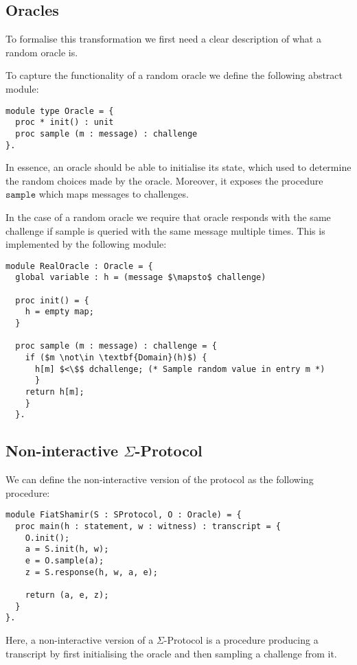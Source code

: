 \subsection{Oracles}
\label{subsec:sigma:fiat:oracle}
To formalise this transformation we first need a clear description of what a
random oracle is.

To capture the functionality of a random oracle we define the following abstract
module:
\begin{lstlisting}
module type Oracle = {
  proc * init() : unit
  proc sample (m : message) : challenge
}.
\end{lstlisting}

In essence, an oracle should be able to initialise its state, which used to
determine the random choices made by the oracle. Moreover, it exposes the
procedure $\texttt{sample}$ which maps messages to challenges.

In the case of a random oracle we require that oracle responds with the same
challenge if sample is queried with the same message multiple times. This is
implemented by the following module:

\begin{lstlisting}[mathescape]
module RealOracle : Oracle = {
  global variable : h = (message $\mapsto$ challenge)

  proc init() = {
    h = empty map;
  }

  proc sample (m : message) : challenge = {
    if ($m \not\in \textbf{Domain}(h)$) {
      h[m] $<\$$ dchallenge; (* Sample random value in entry m *)
      }
    return h[m];
    }
  }.
\end{lstlisting}

\subsection{Non-interactive $\Sigma$-Protocol}
\label{subsec:sigma:fiat:protocol}
We can define the non-interactive version of the protocol as the following procedure:
\begin{lstlisting}
module FiatShamir(S : SProtocol, O : Oracle) = {
  proc main(h : statement, w : witness) : transcript = {
    O.init();
    a = S.init(h, w);
    e = O.sample(a);
    z = S.response(h, w, a, e);

    return (a, e, z);
  }
}.
\end{lstlisting}

Here, a non-interactive version of a $\Sigma$-Protocol is a procedure producing
a transcript by first initialising the oracle and then sampling a challenge from it.

